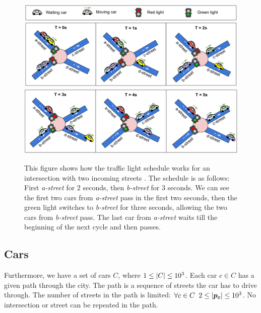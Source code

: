 \begin{figure}[ht] %
    \centering
    \includegraphics[width=\linewidth]{img/hashcode/figure2-abc.png}
    \includegraphics[width=\linewidth]{img/hashcode/figure2-def.png}
    \caption[Example of a traffic light schedule]{
        This figure shows how the traffic light schedule works for an intersection with two incoming streets \cite{google2023google}.
        The schedule is as follows: First \textit{a-street} for $2$ seconds, then \textit{b-street} for $3$ seconds.
        We can see the first two cars from \textit{a-street} pass in the first two seconds, then the green light switches to \textit{b-street} for three seconds,
        allowing the two cars from \textit{b-street} pass. The last car from \textit{a-street} waits till the beginning of the next cycle and then passes.
    }
    \label{fig:hashcode_traffic_lights}
\end{figure}

\subsection{Cars}

Furthermore, we have a set of cars $C$, where $1 \leq \left|{C}\right| \leq 10^3$. Each car $c \in C$ has a given path through the city. The path is a sequence of streets the car has to drive through. The number of streets in the path is limited: $\forall c \in C \;\; 2 \leq \left|{\bm{p_c}}\right| \leq 10^3$. No intersection or street can be repeated in the path.

